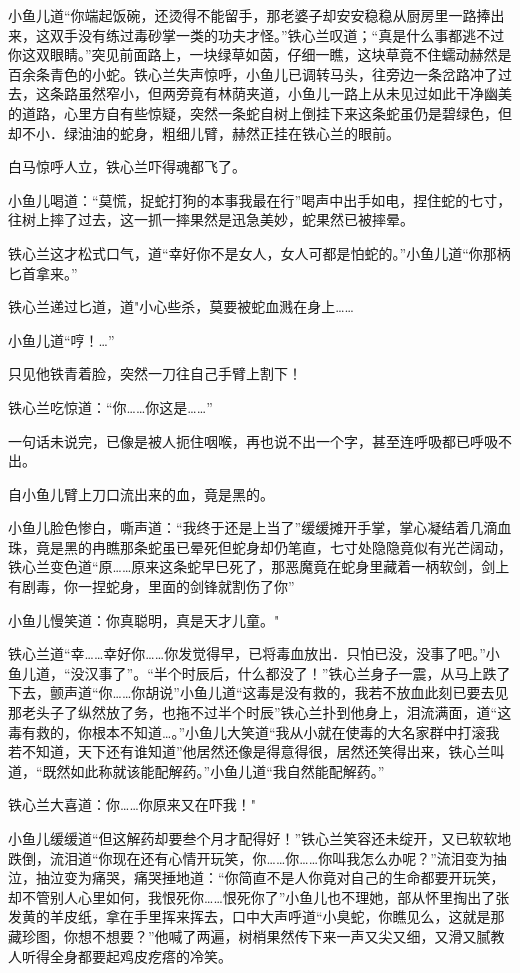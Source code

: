 \documentclass[12pt,oneside]{book}
\begin{document}
小鱼儿道``你端起饭碗，还烫得不能留手，那老婆子却安安稳稳从厨房里一路捧出来，这双手没有练过毒砂掌一类的功夫才怪。''铁心兰叹道；``真是什么事都逃不过你这双眼睛。''突见前面路上，一块绿草如茵，仔细一瞧，这块草竟不住蠕动赫然是百余条青色的小蛇。铁心兰失声惊呼，小鱼儿已调转马头，往旁边一条岔路冲了过去，这条路虽然窄小，但两旁竟有林荫夹道，小鱼儿一路上从未见过如此干净幽美的道路，心里方自有些惊疑，突然一条蛇自树上倒挂下来这条蛇虽仍是碧绿色，但却不小．绿油油的蛇身，粗细儿臂，赫然正挂在铁心兰的眼前。

白马惊呼人立，铁心兰吓得魂都飞了。

小鱼儿喝道：``莫慌，捉蛇打狗的本事我最在行''喝声中出手如电，捏住蛇的七寸，往树上摔了过去，这一抓一摔果然是迅急美妙，蛇果然已被摔晕。

铁心兰这才松式口气，道``幸好你不是女人，女人可都是怕蛇的。''小鱼儿道``你那柄匕首拿来。''

铁心兰递过匕道，道"小心些杀，莫要被蛇血溅在身上\ldots\ldots{}

小鱼儿道``哼！\ldots{}''

只见他铁青着脸，突然一刀往自己手臂上割下！

铁心兰吃惊道：``你\ldots\ldots 你这是\ldots\ldots{}''

一句话未说完，已像是被人扼住咽喉，再也说不出一个字，甚至连呼吸都已呼吸不出。

自小鱼儿臂上刀口流出来的血，竟是黑的。

小鱼儿脸色惨白，嘶声道：``我终于还是上当了''缓缓摊开手掌，掌心凝结着几滴血珠，竟是黑的冉瞧那条蛇虽已晕死但蛇身却仍笔直，七寸处隐隐竟似有光芒阔动，铁心兰变色道``原\ldots\ldots 原来这条蛇早巳死了，那恶魔竟在蛇身里藏着一柄软剑，剑上有剧毒，你一捏蛇身，里面的剑锋就割伤了你''

小鱼儿慢笑道：你真聪明，真是天才儿童。"

铁心兰道``幸\ldots\ldots 幸好你\ldots\ldots 你发觉得早，已将毒血放出．只怕已没，没事了吧。''小鱼儿道，``没汉事了''。``半个时辰后，什么都没了！''铁心兰身子一震，从马上跌了下去，颤声道``你\ldots\ldots 你胡说''小鱼儿道``这毒是没有救的，我若不放血此刻已要去见那老头子了纵然放了务，也拖不过半个时辰''铁心兰扑到他身上，泪流满面，道``这毒有救的，你根本不知道\ldots。''小鱼儿大笑道``我从小就在使毒的大名家群中打滚我若不知道，天下还有谁知道''他居然还像是得意得很，居然还笑得出来，铁心兰叫道，``既然如此称就该能配解药。''小鱼儿道``我自然能配解药。''

铁心兰大喜道：你\ldots\ldots 你原来又在吓我！"

小鱼儿缓缓道``但这解药却要叁个月才配得好！''铁心兰笑容还未绽开，又已软软地跌倒，流泪道``你现在还有心情开玩笑，你\ldots\ldots 你\ldots\ldots 你叫我怎么办呢？''流泪变为抽泣，抽泣变为痛哭，痛哭捶地道：``你简直不是人你竟对自己的生命都要开玩笑，却不管别人心里如何，我恨死你\ldots\ldots 恨死你了''小鱼儿也不理她，部从怀里掏出了张发黄的羊皮纸，拿在手里挥来挥去，口中大声呼道``小臭蛇，你瞧见么，这就是那藏珍图，你想不想要？''他喊了两遍，树梢果然传下来一声又尖又细，又滑又腻教人听得全身都要起鸡皮疙瘩的冷笑。
\end{document}
